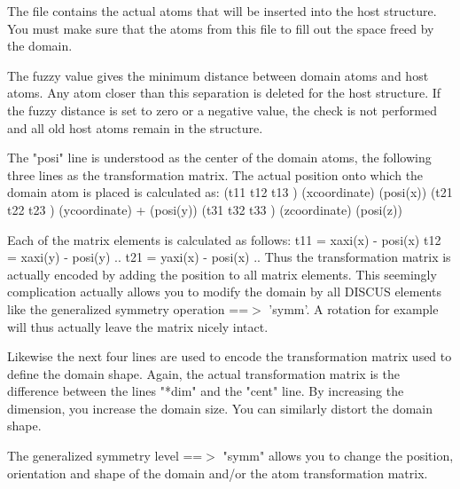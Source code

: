 The file contains the actual atoms that will be inserted into the 
host structure. You must make sure that the atoms from this file to 
fill out the space freed by the domain. 
\par
The fuzzy value gives the minimum distance between domain atoms and 
host atoms. Any atom closer than this separation is deleted for the 
host structure. 
If the fuzzy distance is set to zero or a negative value, the check 
is not performed and all old host atoms remain in the structure. 
\par
The "posi" line is understood as the center of the domain atoms, 
the following three lines as the transformation matrix. The actual 
position onto which the domain atom is placed is calculated as: 
(t11  t12  t13 ) (xcoordinate)   (posi(x)) 
(t21  t22  t23 ) (ycoordinate) + (posi(y)) 
(t31  t32  t33 ) (zcoordinate)   (posi(z)) 
\par
Each of the matrix elements is calculated as follows: 
t11 = xaxi(x) - posi(x) 
t12 = xaxi(y) - posi(y) 
.. 
t21 = yaxi(x) - posi(x) 
.. 
Thus the transformation matrix is actually encoded by adding the 
position to all matrix elements. This seemingly complication actually 
allows you to modify the domain by all DISCUS elements like the 
generalized symmetry operation ==$> $ 'symm'. A rotation for example will 
thus actually leave the matrix nicely intact. 
\par
Likewise the next four lines are used to encode the transformation 
matrix used to define the domain shape. Again, the actual transformation 
matrix is the difference between the lines "*dim" and the "cent" line. 
By increasing the dimension, you increase the domain size. You can 
similarly distort the domain shape. 
\par
The generalized symmetry level ==$> $ "symm" allows you to change the 
position, orientation and shape of the domain and/or the atom transformation 
matrix. 
